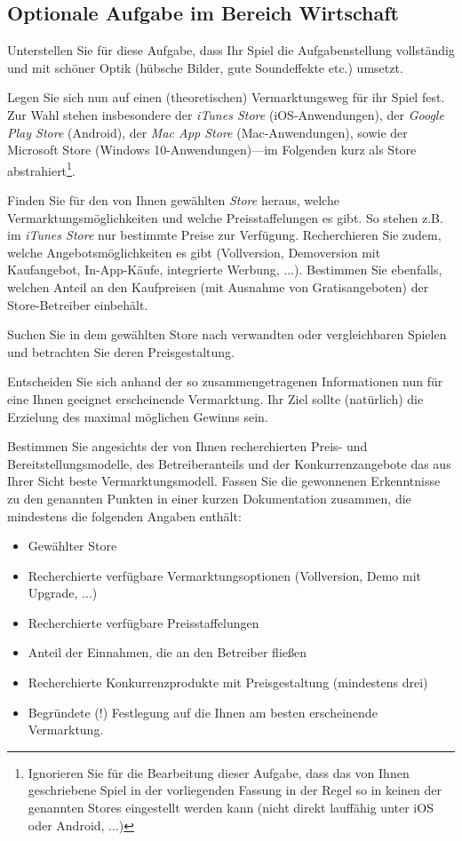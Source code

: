 \subsection{Optionale Aufgabe im Bereich Wirtschaft}

Unterstellen Sie f\"ur diese Aufgabe, dass Ihr Spiel die Aufgabenstellung
vollst\"andig und \glqq{}mit sch\"oner Optik\grqq{} (h\"ubsche Bilder, gute Soundeffekte etc.) umsetzt.
	
Legen Sie sich nun auf einen (theoretischen) Vermarktungsweg f\"ur ihr Spiel fest. Zur Wahl stehen insbesondere
der \emph{iTunes Store} (iOS-Anwendungen), der \emph{Google Play Store} (Android), der \emph{Mac App Store} (Mac-Anwendungen),
sowie der Microsoft Store (Windows 10-Anwendungen)---im Folgenden kurz als \glqq{}Store\grqq{} abstrahiert\footnote{Ignorieren
	Sie f\"ur die Bearbeitung dieser Aufgabe, dass das von Ihnen geschriebene Spiel in der vorliegenden Fassung in der
	Regel so in keinen der genannten Stores eingestellt werden kann (nicht direkt lauff\"ahig unter iOS oder Android, ...)}.
	
Finden Sie f\"ur den von Ihnen gew\"ahlten \emph{Store} heraus, welche Vermarktungsm\"oglichkeiten und
welche Preisstaffelungen es gibt. So stehen z.B. im \emph{iTunes Store} nur bestimmte Preise zur Verf\"ugung.
Recherchieren Sie zudem, welche Angebotsm\"oglichkeiten es gibt (Vollversion, Demoversion mit Kaufangebot, In-App-K\"aufe,
integrierte Werbung, ...). Bestimmen Sie ebenfalls, welchen Anteil an den Kaufpreisen (mit Ausnahme von Gratisangeboten)
der Store-Betreiber einbeh\"alt.
	
Suchen Sie in dem gew\"ahlten Store nach verwandten oder vergleichbaren Spielen und betrachten Sie deren Preisgestaltung.

Entscheiden Sie sich anhand der so zusammengetragenen Informationen nun f\"ur eine Ihnen geeignet erscheinende Vermarktung. Ihr
Ziel sollte (nat\"urlich) die Erzielung des maximal m\"oglichen Gewinns sein.

Bestimmen Sie angesichts der von Ihnen recherchierten Preis- und Bereitstellungsmodelle, des Betreiberanteils und der
\glqq{}Konkurrenzangebote\grqq{} das aus Ihrer Sicht beste Vermarktungsmodell. Fassen Sie die gewonnenen Erkenntnisse zu den 
genannten Punkten in einer kurzen Dokumentation zusammen, die mindestens die folgenden Angaben enth\"alt:
	
\begin{itemize}
\item Gew\"ahlter Store
\item Recherchierte verf\"ugbare Vermarktungsoptionen (Vollversion, Demo mit Upgrade, ...)
\item Recherchierte verf\"ugbare Preisstaffelungen
\item Anteil der Einnahmen, die an den Betreiber flie\ss{}en
\item Recherchierte Konkurrenzprodukte mit Preisgestaltung (mindestens drei)
\item Begr\"undete (!) Festlegung auf die Ihnen am besten erscheinende Vermarktung.		
\end{itemize}

